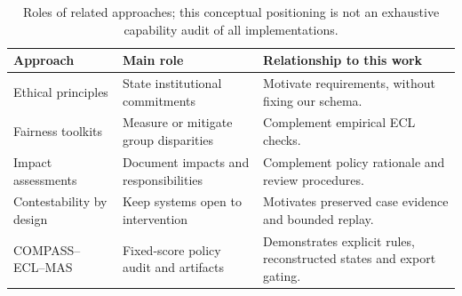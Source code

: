 \begin{table}[t]
\centering\small
\caption{Roles of related approaches; this conceptual positioning is not an exhaustive capability audit of all implementations.}
\label{tab:positioning}
\begin{tabularx}{\textwidth}{lXX}
\toprule
Approach & Main role & Relationship to this work \\
\midrule
Ethical principles & State institutional commitments & Motivate requirements, without fixing our schema. \\
Fairness toolkits & Measure or mitigate group disparities & Complement empirical ECL checks. \\
Impact assessments & Document impacts and responsibilities & Complement policy rationale and review procedures. \\
Contestability by design & Keep systems open to intervention & Motivates preserved case evidence and bounded replay. \\
COMPASS--ECL--MAS & Fixed-score policy audit and artifacts & Demonstrates explicit rules, reconstructed states and export gating. \\
\bottomrule
\end{tabularx}
\end{table}
